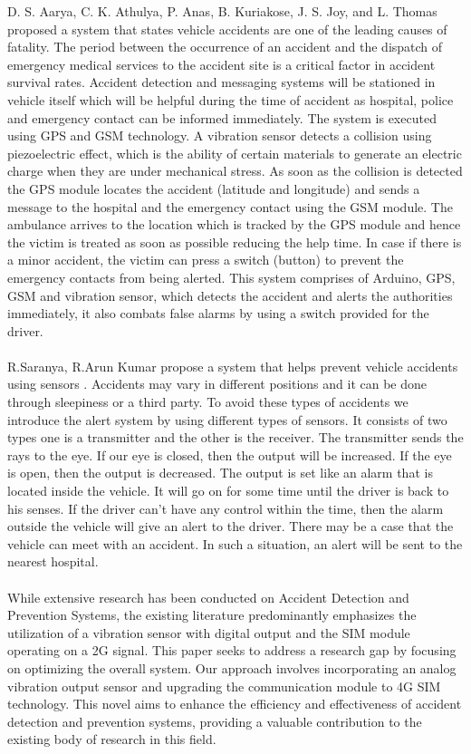 \documentclass[12pt,a4paper]{report}
\begin{document}
\begin{justify}
            D. S. Aarya, C. K. Athulya, P. Anas, B. Kuriakose, J. S. Joy, and L. Thomas \cite{Aarya2018} proposed a system that states vehicle accidents are one of the leading causes of fatality. The period between the occurrence of an accident and the dispatch of emergency medical services to the accident site is a critical factor in accident survival rates. Accident detection and messaging systems will be stationed in vehicle itself which will be helpful during the time of accident as hospital, police and emergency contact can be informed immediately. The system is executed using GPS and GSM technology. A vibration sensor detects a collision using piezoelectric effect, which is the ability of certain materials to generate an electric charge when they are under mechanical stress. As soon as the collision is detected the GPS module locates the accident (latitude and longitude) and sends a message to the hospital and the emergency contact using the GSM module. The ambulance arrives to the location which is tracked by the GPS module and hence the victim is treated as soon as possible reducing the help time. In case if there is a minor accident, the victim can press a switch (button) to prevent the emergency contacts from being alerted. This system comprises of Arduino, GPS, GSM and vibration sensor, which detects the accident and alerts the authorities immediately, it also combats false alarms by using a switch provided for the driver.\\\\
            R.Saranya, R.Arun Kumar propose a system that helps prevent vehicle accidents using sensors \cite{Saranya2017}. Accidents may vary in different positions and it can be done through sleepiness or a third party. To avoid these
types of accidents we introduce the alert system by using
different types of sensors. It consists of two types one is
a transmitter and the other is the receiver. The transmitter sends
the rays to the eye. If our eye is closed, then the output will be
increased. If the eye is open, then the output is decreased.
The output is set like an alarm that is located inside the
vehicle. It will go on for some time until the driver is
back to his senses. If the driver can’t have any control within
the time, then the alarm outside the vehicle will give an alert to
the driver. There may be a case that the vehicle can meet
with an accident. In such a situation, an alert will be sent to the
nearest hospital.\\\\
            While extensive research has been conducted on Accident Detection and Prevention Systems, the existing literature predominantly emphasizes the utilization of a vibration sensor with digital output and the SIM module operating on a 2G signal. This paper seeks to address a research gap by focusing on optimizing the overall system. Our approach involves incorporating an analog vibration output sensor and upgrading the communication module to 4G SIM technology. This novel aims to enhance the efficiency and effectiveness of accident detection and prevention systems, providing a valuable contribution to the existing body of research in this field.
        \end{justify}
	
\end{document}
